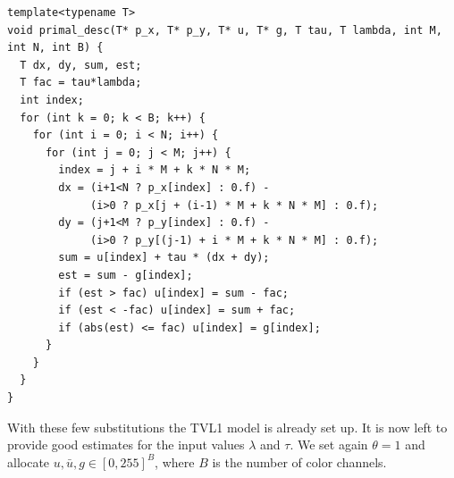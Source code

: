 \documentclass[abstracton]{scrreprt}
\begin{document}
        \begin{lstlisting}
template<typename T>
void primal_desc(T* p_x, T* p_y, T* u, T* g, T tau, T lambda, int M, int N, int B) {
  T dx, dy, sum, est;
  T fac = tau*lambda;
  int index;
  for (int k = 0; k < B; k++) {
    for (int i = 0; i < N; i++) {
      for (int j = 0; j < M; j++) {
        index = j + i * M + k * N * M;
        dx = (i+1<N ? p_x[index] : 0.f) -
             (i>0 ? p_x[j + (i-1) * M + k * N * M] : 0.f);
        dy = (j+1<M ? p_y[index] : 0.f) -
             (i>0 ? p_y[(j-1) + i * M + k * N * M] : 0.f);
        sum = u[index] + tau * (dx + dy);
        est = sum - g[index];
        if (est > fac) u[index] = sum - fac;
        if (est < -fac) u[index] = sum + fac;
        if (abs(est) <= fac) u[index] = g[index];
      }
    }
  }
}
        \end{lstlisting} 
        With these few substitutions the TVL1 model is already set up. It is now left to provide good estimates for the input values $\lambda$ and $\tau$. We set again $\theta = 1$ and allocate $u, \bar{u}, g \in [0, 255]^{B}$, where $B$ is the number of color channels.
\end{document}
